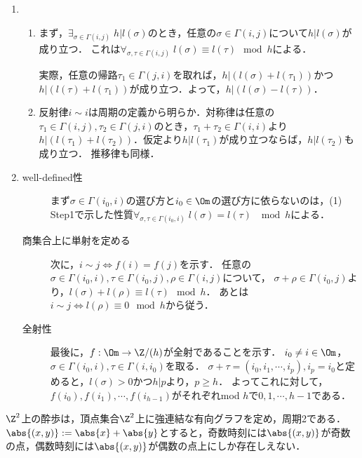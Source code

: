 \documentclass[uplatex, dvipdfmx]{jsreport}
\begin{document}
\begin{Proof}\mbox{}
    \begin{enumerate}
        \item 
        \begin{enumerate}[{Step}1]
            \item まず，$\exists_{\sigma\in\Gamma(i,j)}\;h|l(\sigma)$のとき，任意の$\sigma\in\Gamma(i,j)$について$h|l(\sigma)$が成り立つ．
            これは$\forall_{\sigma,\tau\in\Gamma(i,j)}\;l(\sigma)\equiv l(\tau)\mod h$による．
    
            実際，任意の帰路$\tau_1\in\Gamma(j,i)$を取れば，$h|(l(\sigma)+l(\tau_1))$かつ$h|(l(\tau)+l(\tau_1))$が成り立つ．よって，$h|(l(\sigma)-l(\tau))$．
            \item 反射律$i\sim i$は周期の定義から明らか．対称律は任意の$\tau_1\in\Gamma(i,j),\tau_2\in\Gamma(j,i)$のとき，$\tau_1+\tau_2\in\Gamma(i,i)$より$h|(l(\tau_1)+l(\tau_2))$．仮定より$h|l(\tau_1)$が成り立つならば，$h|l(\tau_2)$も成り立つ．
            推移律も同様．
        \end{enumerate}
        \item 
        \begin{description}
            \item[well-defined性] まず$\sigma\in\Gamma(i_0,i)$の選び方と$i_0\in\Om$の選び方に依らないのは，(1) Step1で示した性質$\forall_{\sigma,\tau\in\Gamma(i_0,i)}\;l(\sigma)=l(\tau)\;\mod h$による．
            \item[商集合上に単射を定める] 次に，$i\sim j\Leftrightarrow f(i)=f(j)$を示す．
            任意の$\sigma\in\Gamma(i_0,i),\tau\in\Gamma(i_0,j),\rho\in\Gamma(i,j)$について，
            $\sigma+\rho\in\Gamma(i_0,j)$より，$l(\sigma)+l(\rho)\equiv l(\tau)\mod h$．
            あとは$i\sim j\Leftrightarrow l(\rho)\equiv0\mod h$から従う．
            \item[全射性] 最後に，$f:\Om\to\Z/(h)$が全射であることを示す．
            $i_0\ne i\in\Om$，$\sigma\in\Gamma(i_0,i),\tau\in\Gamma(i,i_0)$を取る．
            $\sigma+\tau=(i_0,i_1,\cdots,i_p),i_p=i_0$と定めると，$l(\sigma)>0$かつ$h|p$より，$p\ge h$．
            よってこれに対して，$f(i_0),f(i_1),\cdots,f(i_{h-1})$がそれぞれmod $h$で$0,1,\cdots,h-1$である．
        \end{description}
    \end{enumerate}
\end{Proof}

\begin{example}
    $\Z^2$上の酔歩は，頂点集合$\Z^2$上に強連結な有向グラフを定め，周期2である．
    $\abs{(x,y)}:=\abs{x}+\abs{y}$とすると，奇数時刻には$\abs{(x,y)}$が奇数の点，偶数時刻には$\abs{(x,y)}$が偶数の点上にしか存在しえない．
\end{example}
\end{document}
